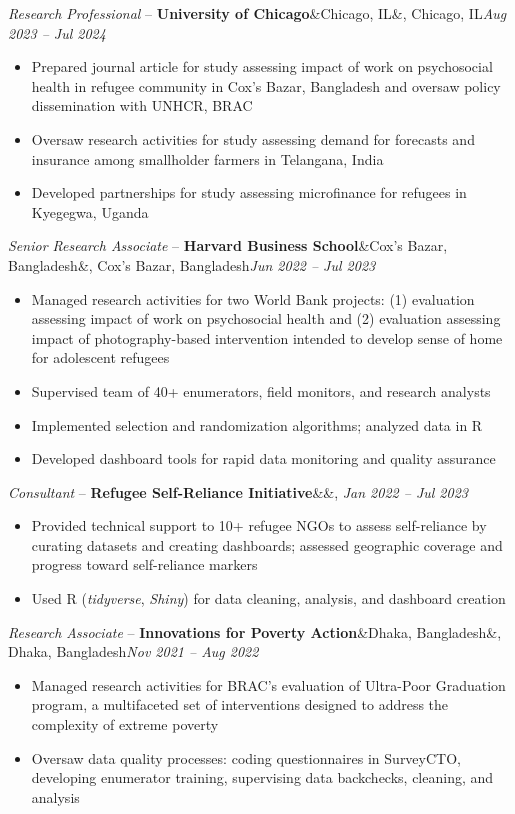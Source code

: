\documentclass[11pt, letterpaper]{article}
\newcommand{\entry}[4]{%
  \noindent\textit{#1} -- \textbf{#2}\ifx&#3&\else, #3\fi \hfill \textit{#4}\\[2pt]
}
\begin{document}
\vspace{4pt}
\entry{Research Professional}{University of Chicago}{Chicago, IL}{Aug 2023 -- Jul 2024}
\begin{itemize}
  \item Prepared journal article for study assessing impact of work on psychosocial health in refugee community in Cox's Bazar, Bangladesh and oversaw policy dissemination with UNHCR, BRAC
  \item Oversaw research activities for study assessing demand for forecasts and insurance among smallholder farmers in Telangana, India
  \item Developed partnerships for study assessing microfinance for refugees in Kyegegwa, Uganda
\end{itemize}

\vspace{4pt}
\entry{Senior Research Associate}{Harvard Business School}{Cox's Bazar, Bangladesh}{Jun 2022 -- Jul 2023}
\begin{itemize}
  \item Managed research activities for two World Bank projects: (1) evaluation assessing impact of work on psychosocial health and (2) evaluation assessing impact of photography-based intervention intended to develop sense of home for adolescent refugees
  \item Supervised team of 40+ enumerators, field monitors, and research analysts
  \item Implemented selection and randomization algorithms; analyzed data in R
  \item Developed dashboard tools for rapid data monitoring and quality assurance
\end{itemize}

\vspace{4pt}
\entry{Consultant}{Refugee Self-Reliance Initiative}{}{Jan 2022 -- Jul 2023}
\begin{itemize}
  \item Provided technical support to 10+ refugee NGOs to assess self-reliance by curating datasets and creating dashboards; assessed geographic coverage and progress toward self-reliance markers
  \item Used R (\textit{tidyverse}, \textit{Shiny}) for data cleaning, analysis, and dashboard creation
\end{itemize}

\vspace{4pt}
\entry{Research Associate}{Innovations for Poverty Action}{Dhaka, Bangladesh}{Nov 2021 -- Aug 2022}
\begin{itemize}
  \item Managed research activities for BRAC's evaluation of Ultra-Poor Graduation program, a multifaceted set of interventions designed to address the complexity of extreme poverty
  \item Oversaw data quality processes: coding questionnaires in SurveyCTO, developing enumerator training, supervising data backchecks, cleaning, and analysis
\end{itemize}
\end{document}

